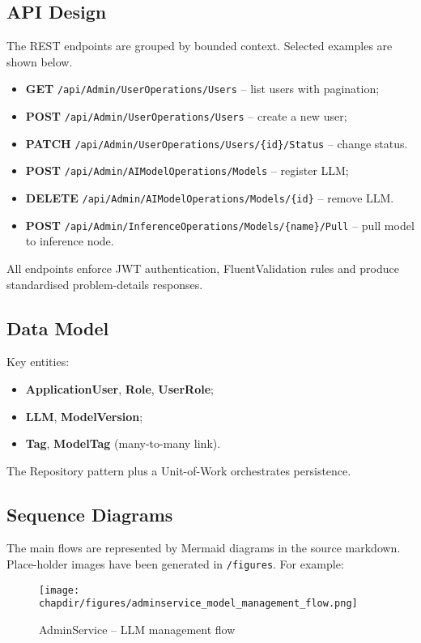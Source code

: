 \subsection{API Design}
The REST endpoints are grouped by bounded context.  Selected examples are shown below.
\begin{itemize}
  \item \textbf{GET} \texttt{/api/Admin/UserOperations/Users} – list users with pagination;
  \item \textbf{POST} \texttt{/api/Admin/UserOperations/Users} – create a new user;
  \item \textbf{PATCH} \texttt{/api/Admin/UserOperations/Users/\{id\}/Status} – change status.
  \item \textbf{POST} \texttt{/api/Admin/AIModelOperations/Models} – register LLM;
  \item \textbf{DELETE} \texttt{/api/Admin/AIModelOperations/Models/\{id\}} – remove LLM.
  \item \textbf{POST} \texttt{/api/Admin/InferenceOperations/Models/\{name\}/Pull} – pull model to inference node.
\end{itemize}
All endpoints enforce JWT authentication, FluentValidation rules and produce standardised problem-details responses.

\subsection{Data Model}
Key entities:
\begin{itemize}
  \item \textbf{ApplicationUser}, \textbf{Role}, \textbf{UserRole};
  \item \textbf{LLM}, \textbf{ModelVersion};
  \item \textbf{Tag}, \textbf{ModelTag} (many-to-many link).
\end{itemize}
The Repository pattern plus a Unit-of-Work orchestrates persistence.

\subsection{Sequence Diagrams}
The main flows are represented by Mermaid diagrams in the source markdown.  Place-holder images have been generated in \texttt{\chapdir/figures}.  For example:
\begin{figure}[h]
    \centering
    \texttt{[image: \\chapdir/figures/adminservice\_model\_management\_flow.png]}
    \caption{AdminService – LLM management flow}
    \label{fig:adminservice-model-flow}
\end{figure}

